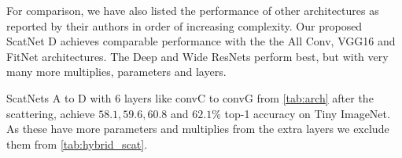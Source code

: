 For comparison, we have also listed the performance of other architectures as
reported by their authors in order of increasing complexity. Our proposed ScatNet D achieves
comparable performance with the the All Conv, VGG16 and FitNet architectures.
The Deep\cite{he_identity_2016} and Wide\cite{zagoruyko_wide_2016}
ResNets perform best, but with very many more
multiplies, parameters and layers.

ScatNets A to D with 6 layers like convC to convG from \autoref{tab:arch} after
the scattering, achieve $58.1, 59.6, 60.8$ and $62.1\%$ top-1 accuracy on Tiny ImageNet. As
these have more parameters and multiplies from the extra layers we exclude them
from \autoref{tab:hybrid_scat}.

